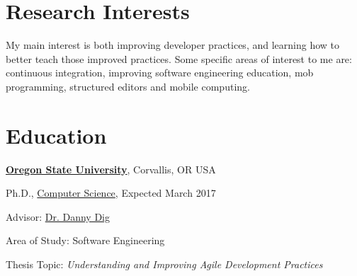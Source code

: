 \documentclass[10pt]{article}
\begin{document}

% 
\thispagestyle{empty}
\section{Research Interests}
My main interest is both improving developer practices, and learning how to better teach those improved practices. 
Some specific areas of interest to me are: continuous integration, improving software engineering education, mob programming, structured editors and mobile computing.
%


\vspace{-5pt}

\section{Education}

\href{http://www.oregonstate.edu/}{\textbf{Oregon State University}},
Corvallis, OR USA
\begin{outerlist}
\item[] Ph.D.,
        \vspace{-.2\baselineskip}
        \href{http://eecs.oregonstate.edu/}
             {Computer Science},
             Expected March 2017
        \begin{innerlist}
        \item Advisor:
              \href{http://dig.cs.illinois.edu/}
                   {Dr. Danny Dig}
        \item Area of Study: Software Engineering 
        \item Thesis Topic: \emph{Understanding and Improving Agile Development Practices}

        \end{innerlist}
\end{outerlist}
\vspace{.5\baselineskip}
\end{document}

